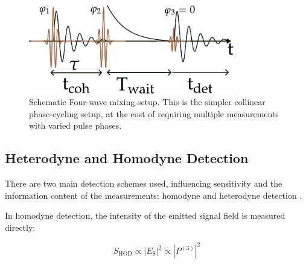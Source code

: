 \begin{figure}[ht]
	\centering
	\includegraphics[width=0.8\textwidth]{../figures/FWM_scheme_phase_cycling.pdf}
	\caption{Schematic Four-wave mixing setup. This is the simpler collinear phase-cycling setup, at the cost of requiring multiple measurements with varied pulse phases.
	}
	\label{fig:fwm_phase_cycling_setup}
\end{figure}







\subsection{Heterodyne and Homodyne Detection}
\label{subsec:heterodyne_homodyne}

\noindent There are two main detection schemes used, influencing sensitivity and the information content of the measurements: homodyne and heterodyne detection \cite{abramaviciusetal2009coherentmultidimensionaloptical}.

\noindent In homodyne detection, the intensity of the emitted signal field is measured directly:

\begin{equation}
	S_{\text{HOD}} \propto |E_{\text{S}}|^2 \propto |P^{(3)}|^2
	\label{eq:homodyne}
\end{equation}

